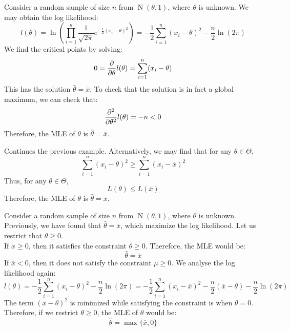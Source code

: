 \documentclass{huhtakm-template-book-v2}
\DeclareMathOperator{\N}{N}
\begin{document}
\newpage
\begin{eg}
	Consider a random sample of size $n$ from $\N(\theta,1)$, where $\theta$ is unknown. We may obtain the log likelihood:
	\begin{equation*}
		l(\theta)=\ln\left(\prod_{i=1}^{n}\frac{1}{\sqrt{2\pi}}e^{-\frac{1}{2}(x_{i}-\theta)^{2}}\right)=-\frac{1}{2}\sum_{i=1}^{n}(x_{i}-\theta)^{2}-\frac{n}{2}\ln(2\pi)
	\end{equation*}
	We find the critical points by solving:
	\begin{equation*}
		0=\pdv*{l(\theta)}{\theta}=\sum_{i=1}^{n}(x_{i}-\theta)
	\end{equation*}
	This has the solution $\hat{\theta}=\overline{x}$. To check that the solution is in fact a global maximum, we can check that:
	\begin{equation*}
		\pdv*[order={2}]{l(\theta)}{\theta}=-n<0
	\end{equation*}
	Therefore, the MLE of $\theta$ is $\hat{\theta}=\overline{x}$.
\end{eg}
\begin{eg}
	Continues the previous example. Alternatively, we may find that for any $\theta\in\Theta$,
	\begin{equation*}
		\sum_{i=1}^{n}(x_{i}-\theta)^{2}\geq\sum_{i=1}^{n}(x_{i}-\overline{x})^{2}
	\end{equation*}
	Thus, for any $\theta\in\Theta$,
	\begin{equation*}
		L(\theta)\leq L(\overline{x})
	\end{equation*}
	Therefore, the MLE of $\theta$ is $\hat{\theta}=\overline{x}$.
\end{eg}
\begin{eg}
	Consider a random sample of size $n$ from $\N(\theta,1)$, where $\theta$ is unknown. Previously, we have found that $\hat{\theta}=\overline{x}$, which maximize the log likelihood. Let us restrict that $\theta\geq 0$.\\
	If $\overline{x}\geq 0$, then it satisfies the constraint $\theta\geq 0$. Therefore, the MLE would be:
	\begin{equation*}
		\hat{\theta}=\overline{x}
	\end{equation*}
	If $\overline{x}<0$, then it does not satisfy the constraint $\mu\geq 0$. We analyse the log likelihood again:
	\begin{equation*}
		l(\theta)=-\frac{1}{2}\sum_{i=1}^{n}(x_{i}-\theta)^{2}-\frac{n}{2}\ln(2\pi)=-\frac{1}{2}\sum_{i=1}^{n}(x_{i}-\overline{x})^{2}-\frac{n}{2}(\overline{x}-\theta)-\frac{n}{2}\ln(2\pi)
	\end{equation*}
	The term $(\overline{x}-\theta)^{2}$ is minimized while satisfying the constraint is when $\theta=0$.\\
	Therefore, if we restrict $\theta\geq 0$, the MLE of $\theta$ would be:
	\begin{equation*}
		\hat{\theta}=\max\{\overline{x},0\}
	\end{equation*}
\end{eg}
\end{document}
